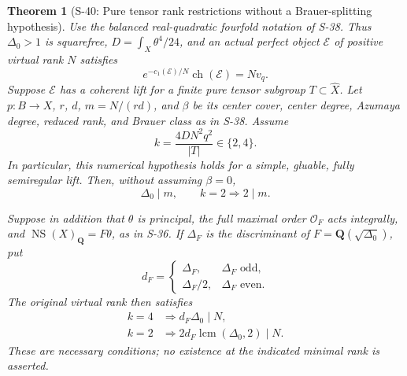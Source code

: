 \documentclass[11pt,a4paper]{article}
\newtheorem{theorem}{Theorem}[section]
\theoremstyle{definition}
\begin{document}
\begin{theorem}[S-40: Pure tensor rank restrictions without a Brauer-splitting hypothesis]
\label{thm:semireg-pure-tensor-unsplit-rank}
Use the balanced real-quadratic fourfold notation of S-38. Thus
$\Delta_0>1$ is squarefree, $D=\int_X\theta^4/24$, and an actual
perfect object $\mathcal E$ of positive virtual rank $N$ satisfies
\[
 e^{-c_1(\mathcal E)/N}\operatorname{ch}(\mathcal E)=Nv_q.
\]
Suppose $\mathcal E$ has a coherent lift for a finite pure tensor
subgroup $T\subset\widehat X$. Let $p:B\to X$, $r$, $d$, $m=N/(rd)$,
and $\beta$ be its center cover, center degree, Azumaya degree,
reduced rank, and Brauer class as in S-38. Assume
\[
 k=\frac{4DN^2q^2}{|T|}\in\{2,4\}.
 \tag{S40.1}
\]
In particular, this numerical hypothesis holds for a simple, gluable,
fully semiregular lift. Then, without assuming $\beta=0$,
\[
 \boxed{\Delta_0\mid m,\qquad k=2\Longrightarrow2\mid m.}
 \tag{S40.2}
\]

Suppose in addition that $\theta$ is principal, the full maximal
order $\mathcal O_F$ acts integrally, and
$\operatorname{NS}(X)_{\mathbf Q}=F\theta$, as in S-36. If
$\Delta_F$ is the discriminant of $F=\mathbf Q(\sqrt{\Delta_0})$,
put
\[
 d_F=\begin{cases}
 \Delta_F,&\Delta_F\text{ odd},\\
 \Delta_F/2,&\Delta_F\text{ even}.
 \end{cases}
\]
The original virtual rank then satisfies
\[
 \boxed{\begin{aligned}
 k=4&\Longrightarrow d_F\Delta_0\mid N,\\
 k=2&\Longrightarrow 2d_F\operatorname{lcm}(\Delta_0,2)\mid N.
 \end{aligned}}
 \tag{S40.3}
\]
These are necessary conditions; no existence at the indicated
minimal rank is asserted.
\end{theorem}
\end{document}

